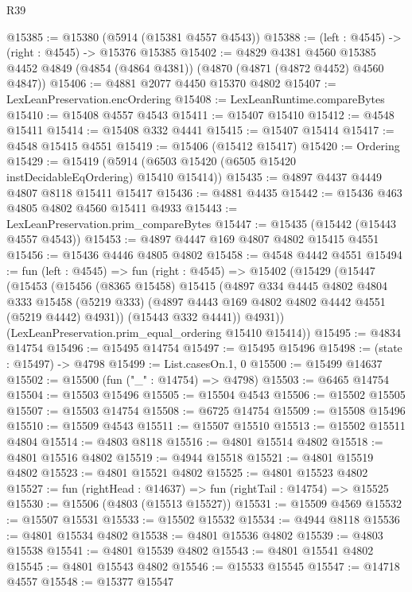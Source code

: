 \begin{lexlean}{R39}
\begin{coremodule}
@15385 := @15380 (@5914 (@15381 @4557 @4543))
@15388 := (left : @4545) -> (right : @4545) -> @15376 @15385
@15402 := @4829
    @4381
    @4560
    @15385
    @4452
    @4849
    (@4854 (@4864 @4381))
    (@4870 (@4871 (@4872 @4452) @4560 @4847))
@15406 := @4881 @2077 @4450 @15370 @4802
@15407 := LexLeanPreservation.encOrdering
@15408 := LexLeanRuntime.compareBytes
@15410 := @15408 @4557 @4543
@15411 := @15407 @15410
@15412 := @4548 @15411
@15414 := @15408 @332 @4441
@15415 := @15407 @15414
@15417 := @4548 @15415 @4551
@15419 := @15406 (@15412 @15417)
@15420 := Ordering
@15429 := @15419 (@5914 (@6503 @15420 (@6505 @15420 instDecidableEqOrdering) @15410 @15414))
@15435 := @4897 @4437 @4449 @4807 @8118 @15411 @15417
@15436 := @4881 @4435
@15442 := @15436 @463 @4805 @4802 @4560 @15411 @4933
@15443 := LexLeanPreservation.prim_compareBytes
@15447 := @15435 (@15442 (@15443 @4557 @4543))
@15453 := @4897 @4447 @169 @4807 @4802 @15415 @4551
@15456 := @15436 @4446 @4805 @4802
@15458 := @4548 @4442 @4551
@15494 := fun (left : @4545) =>
  fun (right : @4545) =>
  @15402
    (@15429
      (@15447
        (@15453
          (@15456
            (@8365 @15458)
            @15415
            (@4897
              @334
              @4445
              @4802
              @4804
              @333
              @15458
              (@5219 @333)
              (@4897 @4443 @169 @4802 @4802 @4442 @4551 (@5219 @4442) @4931))
            (@15443 @332 @4441))
          @4931))
      (LexLeanPreservation.prim_equal_ordering @15410 @15414))
@15495 := @4834 @14754
@15496 := @15495 @14754
@15497 := @15495 @15496
@15498 := (state : @15497) -> @4798
@15499 := List.casesOn.{1, 0}
@15500 := @15499 @14637
@15502 := @15500 (fun ("_" : @14754) => @4798)
@15503 := @6465 @14754
@15504 := @15503 @15496
@15505 := @15504 @4543
@15506 := @15502 @15505
@15507 := @15503 @14754
@15508 := @6725 @14754
@15509 := @15508 @15496
@15510 := @15509 @4543
@15511 := @15507 @15510
@15513 := @15502 @15511 @4804
@15514 := @4803 @8118
@15516 := @4801 @15514 @4802
@15518 := @4801 @15516 @4802
@15519 := @4944 @15518
@15521 := @4801 @15519 @4802
@15523 := @4801 @15521 @4802
@15525 := @4801 @15523 @4802
@15527 := fun (rightHead : @14637) => fun (rightTail : @14754) => @15525
@15530 := @15506 (@4803 (@15513 @15527))
@15531 := @15509 @4569
@15532 := @15507 @15531
@15533 := @15502 @15532
@15534 := @4944 @8118
@15536 := @4801 @15534 @4802
@15538 := @4801 @15536 @4802
@15539 := @4803 @15538
@15541 := @4801 @15539 @4802
@15543 := @4801 @15541 @4802
@15545 := @4801 @15543 @4802
@15546 := @15533 @15545
@15547 := @14718 @4557
@15548 := @15377 @15547

\end{coremodule}
\end{lexlean}

